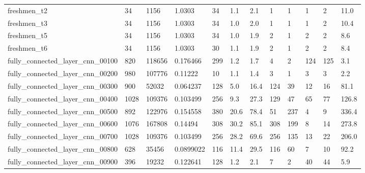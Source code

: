 \begin{longtable}{llllllllllll}
 freshmen\_t2                                        & 34         & 1156      & 1.0303      & 34    & 1.1    & 2.1    & 1     & 1      & 1      & 2      & 11.0    \\
 freshmen\_t3                                        & 34         & 1156      & 1.0303      & 34    & 1.0    & 2.0    & 1     & 1      & 1      & 2      & 10.4    \\
 freshmen\_t5                                        & 34         & 1156      & 1.0303      & 34    & 1.0    & 1.9    & 2     & 1      & 2      & 2      & 8.6     \\
 freshmen\_t6                                        & 34         & 1156      & 1.0303      & 30    & 1.1    & 1.9    & 2     & 1      & 2      & 2      & 8.4     \\
 fully\_connected\_layer\_cnn\_00100                    & 820        & 118656    & 0.176466    & 299   & 1.2    & 1.7    & 4     & 2      & 124    & 125    & 3.1     \\
 fully\_connected\_layer\_cnn\_00200                    & 980        & 107776    & 0.11222     & 10    & 1.1    & 1.4    & 3     & 1      & 3      & 3      & 2.2     \\
 fully\_connected\_layer\_cnn\_00300                    & 900        & 52032     & 0.064237    & 128   & 5.0    & 16.4   & 124   & 39     & 12     & 16     & 81.1    \\
 fully\_connected\_layer\_cnn\_00400                    & 1028       & 109376    & 0.103499    & 256   & 9.3    & 27.3   & 129   & 47     & 65     & 77     & 126.8   \\
 fully\_connected\_layer\_cnn\_00500                    & 892        & 122976    & 0.154558    & 380   & 20.6   & 78.4   & 51    & 237    & 4      & 9      & 336.4   \\
 fully\_connected\_layer\_cnn\_00600                    & 1076       & 167808    & 0.14494     & 308   & 30.2   & 85.1   & 308   & 199    & 8      & 14     & 273.8   \\
 fully\_connected\_layer\_cnn\_00700                    & 1028       & 109376    & 0.103499    & 256   & 28.2   & 69.6   & 256   & 135    & 13     & 22     & 206.0   \\
 fully\_connected\_layer\_cnn\_00800                    & 628        & 35456     & 0.0899022   & 116   & 11.4   & 29.5   & 116   & 60     & 7      & 10     & 92.2    \\
 fully\_connected\_layer\_cnn\_00900                    & 396        & 19232     & 0.122641    & 128   & 1.2    & 2.1    & 7     & 2      & 40     & 44     & 5.9     \\

\end{longtable}
